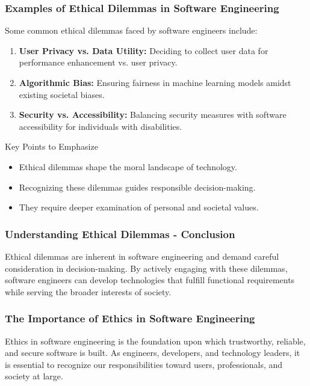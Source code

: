 \documentclass{beamer}
\begin{document}
\begin{frame}[fragile]
    \frametitle{Examples of Ethical Dilemmas in Software Engineering}
    Some common ethical dilemmas faced by software engineers include:
    
    \begin{enumerate}
        \item \textbf{User Privacy vs. Data Utility:} Deciding to collect user data for performance enhancement vs. user privacy.
        \item \textbf{Algorithmic Bias:} Ensuring fairness in machine learning models amidst existing societal biases.
        \item \textbf{Security vs. Accessibility:} Balancing security measures with software accessibility for individuals with disabilities.
    \end{enumerate}
    
    \begin{block}{Key Points to Emphasize}
        \begin{itemize}
            \item Ethical dilemmas shape the moral landscape of technology.
            \item Recognizing these dilemmas guides responsible decision-making.
            \item They require deeper examination of personal and societal values.
        \end{itemize}
    \end{block}
\end{frame}

\begin{frame}[fragile]
    \frametitle{Understanding Ethical Dilemmas - Conclusion}
    Ethical dilemmas are inherent in software engineering and demand careful consideration in decision-making. 
    By actively engaging with these dilemmas, software engineers can develop technologies that fulfill functional requirements while serving the broader interests of society.
\end{frame}

\begin{frame}[fragile]
    \frametitle{The Importance of Ethics in Software Engineering}
    Ethics in software engineering is the foundation upon which trustworthy, reliable, and secure software is built. As engineers, developers, and technology leaders, it is essential to recognize our responsibilities toward users, professionals, and society at large. 
\end{frame}
\end{document}
